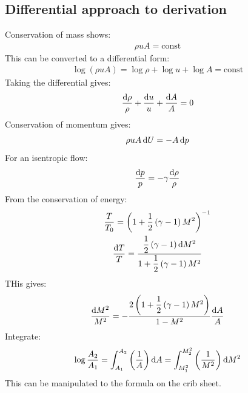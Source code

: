 \documentclass[class=report, crop=false, 12pt,a4paper]{standalone}
\begin{document}
\subsection{Differential approach to derivation}
Conservation of mass shows:
\begin{gather}
    \rho u A = \textrm{const}
\end{gather}
This can be converted to a differential form:
\begin{gather}
    \log\left(\rho u A\right) = \log \rho + \log u + \log A = \textrm{const}
\end{gather}
Taking the differential gives:
\begin{gather}
    \dfrac{\dif \rho}{\rho} + \dfrac{\dif u }{u} + \dfrac{\dif A}{A} = 0
\end{gather}
Conservation of momentum gives:
\begin{gather}
    \rho u A \dif U = - A \dif p
\end{gather}
For an isentropic flow:
\begin{gather}
    \dfrac{\dif p}{p} = - \gamma \dfrac{\dif \rho}{\rho}
\end{gather}
From the conservation of energy:
\begin{gather}
    \dfrac{T}{T_0} = \left(1 + \dfrac{1}{2}\left(\gamma - 1\right)M^2\right)^{-1}\\
    \dfrac{\dif T}{T} = \dfrac{\dfrac{1}{2}\left(\gamma -1\right)\dif M^2}{1 + \dfrac{1}{2}\left(\gamma -1 \right)M^2}
\end{gather}
THis gives:
\begin{gather}
    \dfrac{\dif M^2}{M^2} = -\dfrac{2\left(1 + \dfrac{1}{2}\left(\gamma - 1\right)M^2\right)}{1-M^2}\dfrac{\dif A}{A}
\end{gather}
Integrate:
\begin{gather}
    \log \frac{A_2}{A_1} = \int_{A_1}^{A_2} \left(\frac{1}{A}\right)\dif A = \int_{M^2_1}^{M^2_2}\left(\frac{1}{M^2}\right)\dif M^2
\end{gather}
This can be manipulated to the formula on the crib sheet.
\end{document}
